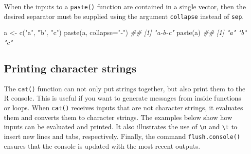\documentclass[
  13,
  letterpaper,
]{report}
\newenvironment{Shaded}{\begin{snugshade}}{\end{snugshade}}
\newcommand{\AttributeTok}[1]{\textcolor[rgb]{0.40,0.45,0.13}{#1}}
\newcommand{\DocumentationTok}[1]{\textcolor[rgb]{0.37,0.37,0.37}{\textit{#1}}}
\newcommand{\FunctionTok}[1]{\textcolor[rgb]{0.28,0.35,0.67}{#1}}
\newcommand{\NormalTok}[1]{\textcolor[rgb]{0.00,0.23,0.31}{#1}}
\newcommand{\OtherTok}[1]{\textcolor[rgb]{0.00,0.23,0.31}{#1}}
\newcommand{\StringTok}[1]{\textcolor[rgb]{0.13,0.47,0.30}{#1}}
\begin{document}
When the inputs to a \texttt{paste()} function are contained in a single
vector, then the desired separator must be supplied using the argument
\texttt{collapse} instead of \texttt{sep}.

\begin{Shaded}
\begin{Highlighting}[]

\NormalTok{a }\OtherTok{\textless{}{-}} \FunctionTok{c}\NormalTok{(}\StringTok{"a"}\NormalTok{, }\StringTok{"b"}\NormalTok{, }\StringTok{"c"}\NormalTok{)}
\FunctionTok{paste}\NormalTok{(a, }\AttributeTok{collapse=}\StringTok{"{-}"}\NormalTok{)}
\DocumentationTok{\#\# [1] "a{-}b{-}c"}
\FunctionTok{paste}\NormalTok{(a)}
\DocumentationTok{\#\# [1] "a" "b" "c"}
\end{Highlighting}
\end{Shaded}

\subsection{Printing character strings}\label{sec-05-char-print}

The \texttt{cat()} function can not only put strings together, but also
print them to the R console. This is useful if you want to generate
messages from inside functions or loops. When \texttt{cat()} receives
inputs that are not character strings, it evaluates them and converts
them to character strings. The examples below show how inputs can be
evaluated and printed. It also illustrates the use of
\texttt{\textbackslash{}n} and \texttt{\textbackslash{}t} to insert new
lines and tabs, respectively. Finally, the command
\texttt{flush.console()} ensures that the console is updated with the
most recent outputs.
\end{document}
